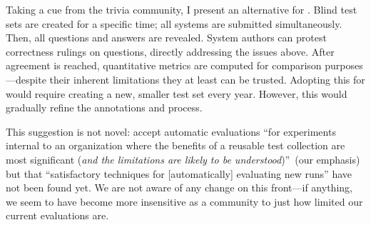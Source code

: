 
Taking a cue from the trivia community, I present an alternative
for .
Blind test sets are created for a specific time; all systems are submitted simultaneously.
Then, all questions and answers are revealed.
System authors can protest correctness rulings on questions, directly
addressing the issues above.
After agreement is reached,
quantitative metrics are computed for comparison purposes---despite their inherent limitations they at least can be
trusted.
Adopting this for  would require creating a new, smaller test
set every year.
However, this would gradually refine the annotations and process.

This suggestion is not novel: \citet{voorhees-00} accept automatic
evaluations ``for experiments internal to an organization where the
benefits of a reusable test collection are most significant (\emph{and
  the limitations are likely to be understood})''~(our emphasis) but
that ``satisfactory techniques for [automatically] evaluating new
runs'' have not been found yet.  We are not aware of any change on
this front---if anything, we seem to have become more insensitive as a
community to just how limited our current evaluations are.
